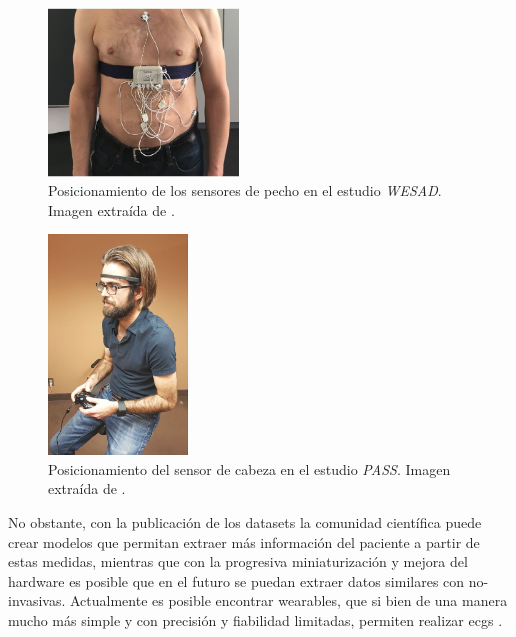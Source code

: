     \begin{figure}[h]
        \centering
        \includegraphics[width=0.45\textwidth]{figures/Posicionamiento pecho wesad.JPG}
        \caption[Posicionamiento de los sensores de pecho en el estudio \textit{WESAD}]
        {Posicionamiento de los sensores de pecho en el estudio \textit{WESAD}. Imagen extraída de \cite{schmidt_introducing_2018}.}
        \label{figure:estado_arte:pecho_wesad}
    \end{figure}

    \begin{figure}[h]
        \centering
        \includegraphics[width=0.33\textwidth]{figures/posiconamiento cabeza pass.JPG}
        \caption[Posicionamiento del sensor de cabeza en el estudio \textit{PASS}]
        {Posicionamiento del sensor de cabeza en el estudio \textit{PASS}. Imagen extraída de \cite{parent_pass_2020}.}
        \label{figure:estado_arte:cabeza_pass}
    \end{figure}

    No obstante, con la publicación de los \glspl{dataset} la comunidad científica puede crear modelos que permitan extraer más información del paciente a partir de estas medidas, mientras que con la progresiva miniaturización y mejora del hardware es posible que en el futuro se puedan extraer datos similares con \glspl{no-invasiva}. Actualmente es posible encontrar \glspl{wearable}, que si bien de una manera mucho más simple y con precisión y fiabilidad limitadas, permiten realizar \glspl{ecg} \cite{garcia_electrocardiograma_2024}.

